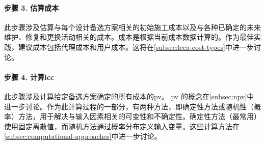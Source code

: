 \paragraph*{步骤 3. 估算成本}
此步骤涉及估算与每个设计备选方案相关的初始施工成本以及与各种已确定的未来维护、修复和更换活动相关的成本。成本是根据当前成本数据计算的。作为最佳实践，建议成本包括代理成本和用户成本。这将在\cref{subsec:lcca-cost-types}中进一步讨论。

\paragraph*{步骤 4. 计算\acrlong*{lcc}}
此步骤涉及计算给定备选方案确定的所有成本的\acrfull{pv}。 \acrshort{pv} 的概念在\cref{subsec:npv}中进一步讨论。作为此计算过程的一部分，有两种方法，即确定性方法或随机性（概率）方法，用于解决与输入因素相关的可变性和不确定性。确定性方法（最常用）使用固定离散值，而随机方法通过概率分布定义输入变量。这些计算方法在\cref{subsec:computational-approaches}中进一步讨论。


